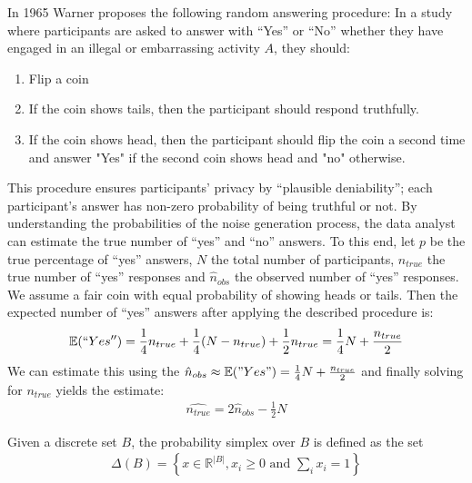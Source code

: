 \begin{ex}
    In 1965 Warner \parencite{stan65rr} proposes the following random answering procedure: In a study where participants are asked to answer with ``Yes'' or ``No'' whether they have engaged in an illegal or embarrassing activity $A$, they should:
    \begin{enumerate}
        \item Flip a coin
        \item If the coin shows tails, then the participant should respond truthfully.
        \item If the coin shows head, then the participant should flip the coin a second time and answer "Yes" if the second coin shows head and "no" otherwise.
    \end{enumerate}
    This procedure ensures participants' privacy by ``plausible deniability''; each participant's answer has non-zero probability of being truthful or not. By understanding the probabilities of the noise generation process, the data analyst can estimate the true number of ``yes'' and ``no'' answers. To this end, let $p$ be the true percentage of ``yes'' answers, $N$ the total number of participants, $n_{true}$ the true number of ``yes'' responses and $\hat{n}_{obs}$ the observed number of ``yes'' responses. We assume a fair coin with equal probability of showing heads or tails. Then the expected number of ``yes'' answers after applying the described procedure is:
    \begin{align}
        \mathbb{E}(``Yes'') = \frac{1}{4} n_{true} + \frac{1}{4} (N-n_{true}) + \frac{1}{2} n_{true} = \frac{1}{4} N + \frac{n_{true}}{2}
    \end{align}
    We can estimate this using the $\hat{n}_{obs} \approx \mathbb{E}("Yes") = \frac{1}{4} N + \frac{n_{true}}{2}$ and finally solving for $n_{true}$ yields the estimate:
    \begin{align}
        \hat{n_{true}} = 2 \hat{n}_{obs} - \frac{1}{2} N
    \end{align}
\end{ex}


\begin{definition}
    Given a discrete set $B$, the probability simplex over $B$ is defined as the set
    \begin{align}
        \Delta(B) = \left\{ x \in \mathbb{R}^{|B|}, x_i \ge 0 \text{ and } \sum_i x_i = 1  \right\}
    \end{align}
\end{definition}


